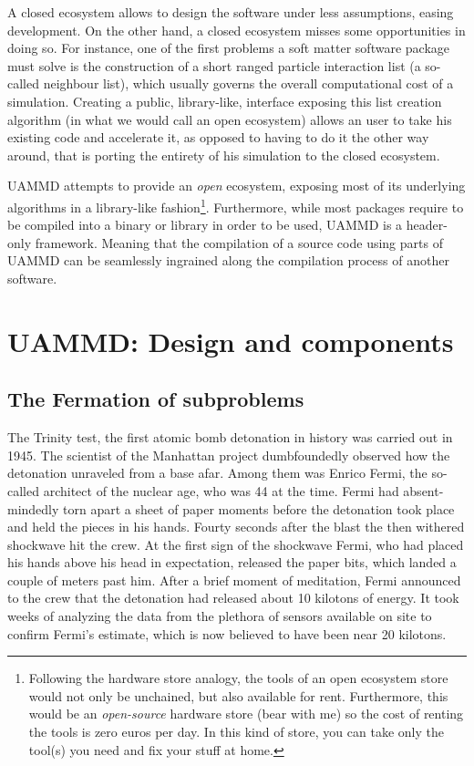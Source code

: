 \documentclass[ twoside,openright,titlepage,numbers=noenddot,%
headinclude,footinclude,cleardoublepage=empty,abstract=on,
BCOR=5mm,paper=a4,fontsize=11pt, dvipsnames
]{scrreprt}
\newcommand{\uammd}{\gls{UAMMD}\xspace}
\newcommand{\gpu}{\gls{GPU}\xspace}
\begin{document}
A closed ecosystem allows to design the software under less assumptions, easing development. On the other hand, a closed ecosystem misses some opportunities in doing so. For instance, one of the first problems a soft matter software package must solve is the construction of a short ranged particle interaction list (a so-called neighbour list), which usually governs the overall computational cost of a simulation. Creating a public, library-like, interface exposing this list creation algorithm (in what we would call an open ecosystem) allows an user to take his existing code and accelerate it, as opposed to having to do it the other way around, that is porting the entirety of his simulation to the closed ecosystem.

\uammd attempts to provide an \emph{open} ecosystem, exposing most of its underlying algorithms in a library-like fashion\footnote{Following the hardware store analogy, the tools of an open ecosystem store would not only be unchained, but also available for rent. Furthermore, this would be an \emph{open-source} hardware store (bear with me) so the cost of renting the tools is zero euros per day. In this kind of store, you can take only the tool(s) you need and fix your stuff at home.}.
Furthermore, while most packages require to be compiled into a binary or library in order to be used, \uammd is a header-only framework. Meaning that the compilation of a source code using parts of \uammd can be seamlessly ingrained along the compilation process of another software.


\newpage
\cleardoublepage
{}
\part{UAMMD: Design and components}\label{pt:uammd}

\chapter{The Fermation of subproblems}
The Trinity test, the first atomic bomb detonation in history was carried out in 1945. The scientist of the Manhattan project dumbfoundedly observed how the detonation unraveled from a base afar. Among them was Enrico Fermi, the so-called architect of the nuclear age, who was 44 at the time. Fermi had absent-mindedly torn apart a sheet of paper moments before the detonation took place and held the pieces in his hands. Fourty seconds after the blast the then withered shockwave hit the crew. At the first sign of the shockwave Fermi, who had placed his hands above his head in expectation, released the paper bits, which landed a couple of meters past him. After a brief moment of meditation, Fermi announced to the crew that the detonation had released about 10 kilotons of energy.
It took weeks of analyzing the data from the plethora of sensors available on site to confirm Fermi's estimate, which is now believed to have been near 20 kilotons.
\end{document}
